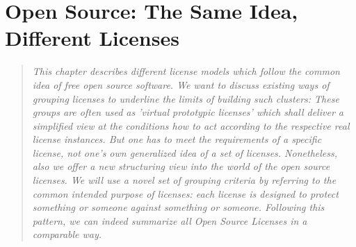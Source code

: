 %
%
%
%
%

\chapter{Open Source: The Same Idea, Different Licenses}\label{sec:LicenseTaxonomies}

\footnotesize \begin{quote}\itshape This chapter describes different license
models which follow the common idea of free open source software. We want to
discuss existing ways of grouping licenses to underline the limits of building
such clusters: These groups are often used as 'virtual prototypic licenses'
which shall deliver a simplified view at the conditions how to act according to
the respective real license instances. But one has to meet the requirements of a
specific license, not one's own generalized idea of a set of licenses.
Nonetheless, also we offer a new structuring view into the world of the open
source licenses. We will use a novel set of grouping criteria by referring
to the common intended purpose of licenses: each license is designed to protect
something or someone against something or someone. Following this pattern, we
can indeed summarize all Open Source Licenses in a comparable way.
\end{quote}
\normalsize{}

